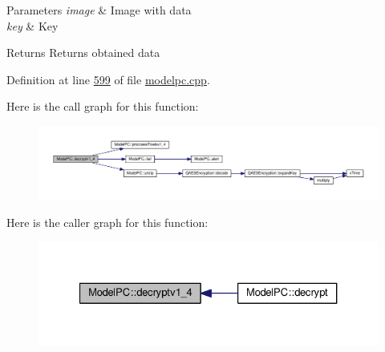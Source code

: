 \begin{DoxyParams}{Parameters}
{\em image} & Image with data \\
\hline
{\em key} & Key \\
\hline
\end{DoxyParams}
\begin{DoxyReturn}{Returns}
Returns obtained data 
\end{DoxyReturn}


Definition at line \hyperlink{modelpc_8cpp_source_l00599}{599} of file \hyperlink{modelpc_8cpp_source}{modelpc.\+cpp}.



Here is the call graph for this function\+:
\nopagebreak
\begin{figure}[H]
\begin{center}
\leavevmode
\includegraphics[width=350pt]{class_model_p_c_a7a1f7d491e1bde16936190b9e90896b0_cgraph}
\end{center}
\end{figure}




Here is the caller graph for this function\+:
\nopagebreak
\begin{figure}[H]
\begin{center}
\leavevmode
\includegraphics[width=327pt]{class_model_p_c_a7a1f7d491e1bde16936190b9e90896b0_icgraph}
\end{center}
\end{figure}


